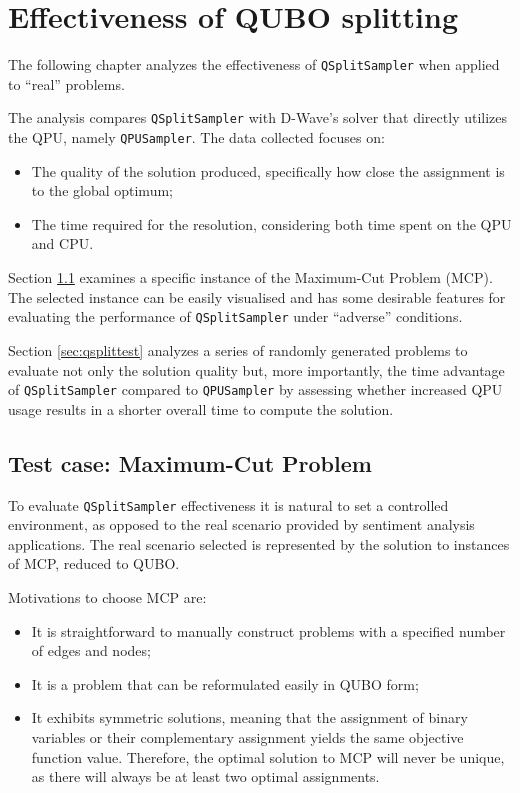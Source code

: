 \chapter{Effectiveness of QUBO splitting}\label{sec:qsplitres}

The following chapter analyzes the effectiveness of \texttt{QSplitSampler} when applied to ``real'' problems.

The analysis compares \texttt{QSplitSampler} with D-Wave's solver that directly utilizes the QPU, namely \texttt{QPUSampler}.
The data collected focuses on:
\begin{itemize}
    \item The quality of the solution produced, specifically how close the assignment is to the global optimum;
    \item The time required for the resolution, considering both time spent on the QPU and CPU.
\end{itemize}

Section \ref{sec:maxcut} examines a specific instance of the Maximum-Cut Problem (MCP).
The selected instance can be easily visualised and has some desirable features for evaluating the performance of \texttt{QSplitSampler} under ``adverse'' conditions.

Section \ref{sec:qsplittest} analyzes a series of randomly generated problems to evaluate not only the solution quality but, more importantly, the time advantage of \texttt{QSplitSampler} compared to \texttt{QPUSampler} by assessing whether increased QPU usage results in a shorter overall time to compute the solution.

\section{Test case: Maximum-Cut Problem}\label{sec:maxcut}

To evaluate \texttt{QSplitSampler} effectiveness it is natural to set a controlled environment, as opposed to the real scenario provided by sentiment analysis applications.
The real scenario selected is represented by the solution to instances of MCP, reduced to QUBO. 

Motivations to choose MCP are:
\begin{itemize}
    \item It is straightforward to manually construct problems with a specified number of edges and nodes;
    \item It is a problem that can be reformulated easily in QUBO form;
    \item It exhibits symmetric solutions, meaning that the assignment of binary variables or their complementary assignment yields the same objective function value.
    Therefore, the optimal solution to MCP will never be unique, as there will always be at least two optimal assignments.
\end{itemize}

